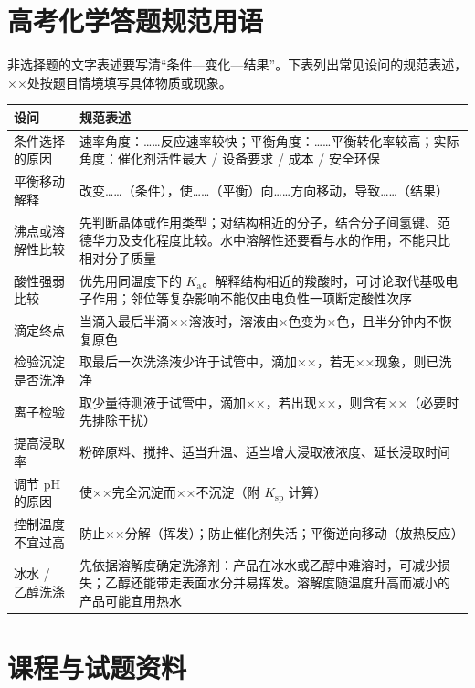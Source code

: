\documentclass[UTF8,a4paper,zihao=5,oneside,openany,fontset=none]{ctexbook}
\begin{document}
\chapter{高考化学答题规范用语}
非选择题的文字表述要写清“条件—变化—结果”。下表列出常见设问的规范表述，××处按题目情境填写具体物质或现象。
\begin{center}
\small
\begin{tabularx}{\linewidth}{p{3.2cm}X}
\toprule
设问 & 规范表述 \\
\midrule
条件选择的原因 & 速率角度：……反应速率较快；平衡角度：……平衡转化率较高；实际角度：催化剂活性最大 / 设备要求 / 成本 / 安全环保 \\
平衡移动解释 & 改变……（条件），使……（平衡）向……方向移动，导致……（结果） \\
沸点或溶解性比较 & 先判断晶体或作用类型；对结构相近的分子，结合分子间氢键、范德华力及支化程度比较。水中溶解性还要看与水的作用，不能只比相对分子质量 \\
酸性强弱比较 & 优先用同温度下的 $K_\text{a}$。解释结构相近的羧酸时，可讨论取代基吸电子作用；邻位等复杂影响不能仅由电负性一项断定酸性次序 \\
滴定终点 & 当滴入最后半滴××溶液时，溶液由×色变为×色，且半分钟内不恢复原色 \\
检验沉淀是否洗净 & 取最后一次洗涤液少许于试管中，滴加××，若无××现象，则已洗净 \\
离子检验 & 取少量待测液于试管中，滴加××，若出现××，则含有××（必要时先排除干扰） \\
提高浸取率 & 粉碎原料、搅拌、适当升温、适当增大浸取液浓度、延长浸取时间 \\
调节 pH 的原因 & 使××完全沉淀而××不沉淀（附 $K_\text{sp}$ 计算） \\
控制温度不宜过高 & 防止××分解（挥发）；防止催化剂失活；平衡逆向移动（放热反应） \\
冰水 / 乙醇洗涤 & 先依据溶解度确定洗涤剂：产品在冰水或乙醇中难溶时，可减少损失；乙醇还能带走表面水分并易挥发。溶解度随温度升高而减小的产品可能宜用热水 \\
\bottomrule
\end{tabularx}
\end{center}

\chapter{课程与试题资料}
\end{document}
